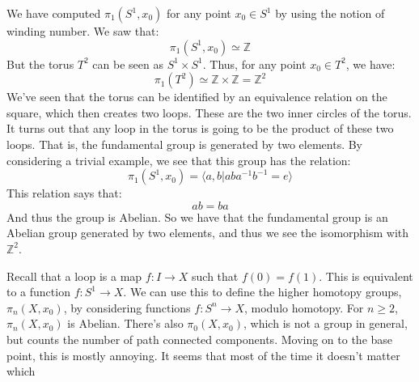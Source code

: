 \documentclass{book}                                                           %
\begin{document}
        \begin{example}
            We have computed $\pi_{1}(S^{1},x_{0})$ for any
            point $x_{0}\in{S}^{1}$ by using the notion of
            winding number. We saw that:
            \begin{equation}
                \pi_{1}(S^{1},x_{0})\simeq\mathbb{Z}
            \end{equation}
            But the torus $T^{2}$ can be seen as
            $S^{1}\times{S}^{1}$. Thus, for any point
            $x_{0}\in{T}^{2}$, we have:
            \begin{equation}
                \pi_{1}(T^{2})\simeq
                \mathbb{Z}\times\mathbb{Z}
                =\mathbb{Z}^{2}
            \end{equation}
            We've seen that the torus can be identified by
            an equivalence relation on the square, which then
            creates two loops. These are the two inner circles
            of the torus. It turns out that any loop in the
            torus is going to be the product of these two loops.
            That is, the fundamental group is generated by
            two elements. By considering a trivial example,
            we see that this group has the relation:
            \begin{equation}
                \pi_{1}(S^{1},x_{0})=
                \langle{a,b}|aba^{-1}b^{-1}=e\rangle
            \end{equation}
            This relation says that:
            \begin{equation}
                ab=ba
            \end{equation}
            And thus the group is Abelian. So we have that
            the fundamental group is an Abelian group
            generated by two elements, and thus we see the
            isomorphism with $\mathbb{Z}^{2}$.
        \end{example}
        Recall that a loop is a map $f:I\rightarrow{X}$
        such that $f(0)=f(1)$. This is equivalent to a
        function $f:S^{1}\rightarrow{X}$. We can use this to
        define the higher homotopy groups, $\pi_{n}(X,x_{0})$,
        by considering functions $f:S^{n}\rightarrow{X}$,
        modulo homotopy. For $n\geq{2}$,
        $\pi_{n}(X,x_{0})$ is Abelian. There's also
        $\pi_{0}(X,x_{0})$, which is not a group in general,
        but counts the number of path connected components.
        Moving on to the base point, this is mostly annoying.
        It seems that most of the time it doesn't matter which
\end{document}
